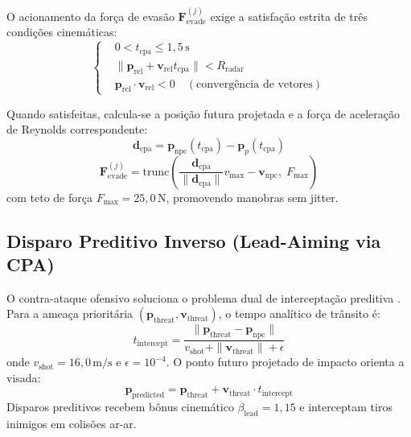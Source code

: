 \documentclass[10pt,conference,twocolumn]{article}
\begin{document}
O acionamento da força de evasão $\mathbf{F}_{\text{evade}}^{(j)}$ exige a satisfação estrita de três condições cinemáticas:
\begin{equation}
\left\{
\begin{aligned}
&0 < t_{\text{cpa}} \le 1{,}5\,\text{s} \\
&\|\mathbf{p}_{\text{rel}} + \mathbf{v}_{\text{rel}} t_{\text{cpa}}\| < R_{\text{radar}} \\
&\mathbf{p}_{\text{rel}} \cdot \mathbf{v}_{\text{rel}} < 0 \quad (\text{convergência de vetores})
\end{aligned}
\right. \label{eq:cpa_conditions}
\end{equation}

Quando satisfeitas, calcula-se a posição futura projetada e a força de aceleração de Reynolds correspondente:
\begin{equation}
\mathbf{d}_{\text{cpa}} = \mathbf{p}_{\text{npc}}(t_{\text{cpa}}) - \mathbf{p}_p(t_{\text{cpa}})
\end{equation}
\begin{equation}
\mathbf{F}_{\text{evade}}^{(j)} = \text{trunc}\left(\frac{\mathbf{d}_{\text{cpa}}}{\|\mathbf{d}_{\text{cpa}}\|} v_{\text{max}} - \mathbf{v}_{\text{npc}}, \; F_{\text{max}}\right) \label{eq:reynolds_steer}
\end{equation}
com teto de força $F_{\text{max}} = 25{,}0\,\text{N}$, promovendo manobras sem jitter.

\subsection{Disparo Preditivo Inverso (Lead-Aiming via CPA)}
O contra-ataque ofensivo soluciona o problema dual de interceptação preditiva \cite{wang2014self}. Para a ameaça prioritária $(\mathbf{p}_{\text{threat}}, \mathbf{v}_{\text{threat}})$, o tempo analítico de trânsito é:
\begin{equation}
t_{\text{intercept}} = \frac{\|\mathbf{p}_{\text{threat}} - \mathbf{p}_{\text{npc}}\|}{v_{\text{shot}} + \|\mathbf{v}_{\text{threat}}\| + \epsilon} \label{eq:t_intercept}
\end{equation}
onde $v_{\text{shot}} = 16{,}0\,\text{m/s}$ e $\epsilon = 10^{-4}$. O ponto futuro projetado de impacto orienta a visada:
\begin{equation}
\mathbf{p}_{\text{predicted}} = \mathbf{p}_{\text{threat}} + \mathbf{v}_{\text{threat}} \cdot t_{\text{intercept}} \label{eq:p_predicted}
\end{equation}
Disparos preditivos recebem bônus cinemático $\beta_{\text{lead}} = 1{,}15$ e interceptam tiros inimigos em colisões ar-ar.
\end{document}
